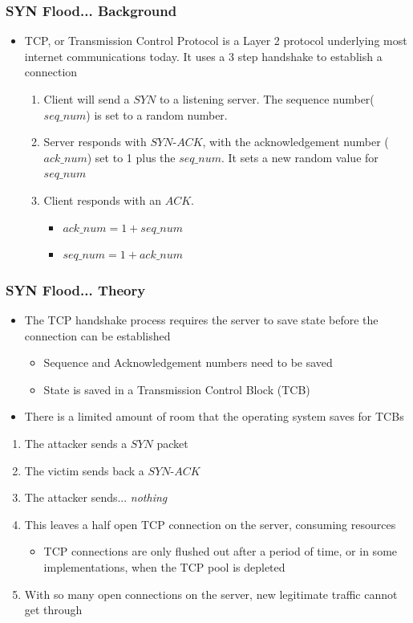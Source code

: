 \documentclass{beamer}
\begin{document}
\begin{frame}
	\frametitle{SYN Flood... Background}
	\begin{itemize}
		\item TCP, or Transmission Control Protocol is a Layer 2 protocol underlying
			most internet communications today.  It uses a 3 step handshake to
			establish a connection
			\begin{enumerate}
				\item Client will send a $SYN$ to a listening server.  The sequence
					number($seq\_num$) is set to a random number.
				\item Server responds with $SYN$-$ACK$, with the acknowledgement number
					($ack\_num$) set to 1 plus the $seq\_num$.  It sets a new random value
					for $seq\_num$
				\item Client responds with an $ACK$.
					\begin{itemize}
						\item $ack\_num = 1 + seq\_num$
						\item $seq\_num = 1 + ack\_num$
					\end{itemize}
			\end{enumerate}
	\end{itemize}
\end{frame}

\begin{frame}[allowframebreaks]
	\frametitle{SYN Flood... Theory}
	\begin{itemize}
		\item The TCP handshake process requires the server to save
			state before the connection can be established
			\begin{itemize}
				\item Sequence and Acknowledgement numbers need to be saved
				\item State is saved in a Transmission Control Block (TCB)
			\end{itemize}
		\item There is a limited amount of room that the operating system saves for
			TCBs 
	\end{itemize}
	\begin{enumerate}
		\item The attacker sends a $SYN$ packet
		\item The victim sends back a $SYN$-$ACK$
		\item The attacker sends... {\em nothing}
		\item This leaves a half open TCP connection on the server, consuming
			resources
			\begin{itemize}
				\item TCP connections are only flushed out after a period of time, or in
					some implementations, when the TCP pool is depleted
			\end{itemize}
		\item With so many open connections on the server, new legitimate traffic
			cannot get through
	\end{enumerate}
\end{frame}
\end{document}
